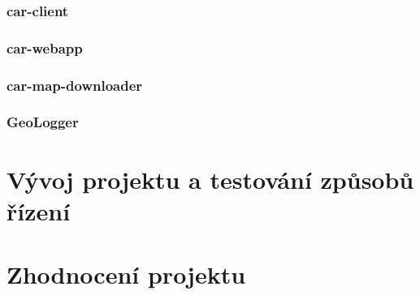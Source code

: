 \documentclass{beamer}
\begin{document}
\begin{frame}
    \frametitle{car-client}
\end{frame}

\begin{frame}
    \frametitle{car-webapp}
\end{frame}

\begin{frame}
    \frametitle{car-map-downloader}
\end{frame}

\begin{frame}
    \frametitle{GeoLogger}
\end{frame}

\section{Vývoj projektu a testování způsobů řízení}

\section{Zhodnocení projektu}
\end{document}
